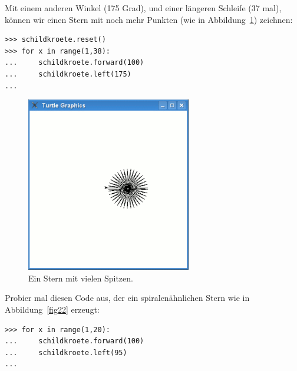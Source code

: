\noindent
Mit einem anderen Winkel (175 Grad), und einer längeren Schleife (37 mal), können wir einen Stern mit noch mehr Punkten (wie in Abbildung~\ref{fig21}) zeichnen:

\begin{Verbatim}[frame=single]
>>> schildkroete.reset()
>>> for x in range(1,38):
...     schildkroete.forward(100)
...     schildkroete.left(175)
...
\end{Verbatim}

\begin{figure}
\begin{center}
\includegraphics[width=72mm]{images/figure21}
\end{center}
\caption{Ein Stern mit vielen Spitzen.}\label{fig21}
\end{figure}

\noindent
Probier mal diesen Code aus, der ein spiralenähnlichen Stern wie in Abbildung~\ref{fig22} erzeugt:

\begin{Verbatim}[frame=single]
>>> for x in range(1,20):
...     schildkroete.forward(100)
...     schildkroete.left(95)
...
\end{Verbatim}

